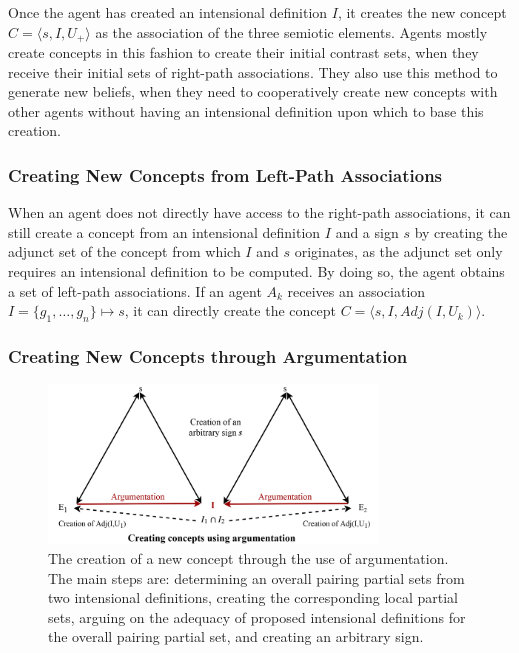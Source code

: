 Once the agent has created an intensional definition $I$, it creates the new concept $C = \langle s,I,U_{+} \rangle$ as the association of the three semiotic elements. Agents mostly create concepts in this fashion to create their initial contrast sets, when they receive their initial sets of right-path associations. They also use this method to generate new beliefs, when they need to cooperatively create new concepts with other agents without having an intensional definition upon which to base this creation. 

\subsubsection{Creating New Concepts from Left-Path Associations}
\label{sec:funCreaConI}

When an agent does not directly have access to the right-path associations, it can still create a concept from an intensional definition $I$ and a sign $s$ by creating the adjunct set of the concept from which $I$ and $s$ originates, as the adjunct set only requires an intensional definition to be computed. By doing so, the agent obtains a set of left-path associations. If an agent $A_{k}$ receives an association $I = \{g_{1}, \ldots, g_{n}\} \mapsto s$, it can directly create the concept $C = \langle s, I,  Adj(I,U_{k}) \rangle$.

\subsubsection{Creating New Concepts through Argumentation}
\label{sec:funCreaConA}

\begin{figure}[t]
    \centering
    \includegraphics[width=0.78\textwidth]{figs/CoopConceptCreation.pdf}
    \caption{The creation of a new concept through the use of argumentation. The main steps are: determining an overall pairing partial sets from two intensional definitions, creating the corresponding local partial sets, arguing on the adequacy of proposed intensional definitions for the overall pairing partial set, and creating an arbitrary sign.}
    \label{fig:CoopConCrea}
\end{figure}

